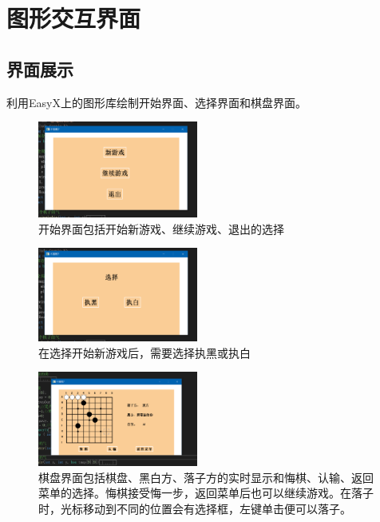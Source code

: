 \documentclass[twocolumn]{article}
\begin{document}
\section{图形交互界面}
\subsection{界面展示}
利用EasyX上的图形库绘制开始界面、选择界面和棋盘界面。
\begin{figure}[H]
\centering  %
\includegraphics[width=0.47\textwidth]{start}
\caption{开始界面包括开始新游戏、继续游戏、退出的选择}
\label{Fig.main}
\end{figure}

\begin{figure}[H]
\centering  %
\includegraphics[width=0.47\textwidth]{choice}
\caption{在选择开始新游戏后，需要选择执黑或执白}
\label{Fig.main}
\end{figure}

\begin{figure}[H]
\centering  %
\includegraphics[width=0.47\textwidth]{map}
\caption{棋盘界面包括棋盘、黑白方、落子方的实时显示和悔棋、认输、返回菜单的选择。悔棋接受悔一步，返回菜单后也可以继续游戏。在落子时，光标移动到不同的位置会有选择框，左键单击便可以落子。
}
\label{Fig.main}
\end{figure}
\end{document}
